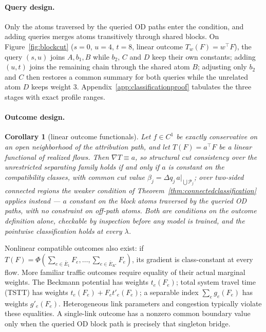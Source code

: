 \documentclass[a4paper,fleqn]{cas-sc}
\newtheorem{corollary}[theorem]{Corollary}
\begin{document}
\paragraph{Query design.}
Only the atoms traversed by the queried OD paths enter the condition, and
adding queries merges atoms transitively through shared blocks. On
Figure~\ref{fig:blockcut} ($s=0$, $u=4$, $t=8$, linear outcome
$T_w(F)=w^\top F$), the query $(s,u)$ joins $A,b_1,B$ while $b_2$, $C$
and $D$ keep their own constants; adding $(u,t)$ joins the remaining
chain through the shared atom $B$; adjusting only $b_2$ and $C$ then
restores a common summary for both queries while the unrelated atom $D$
keeps weight $3$. Appendix~\ref{app:classificationproof} tabulates the
three stages with exact profile ranges.

\paragraph{Outcome design.}
\begin{corollary}[linear outcome functionals]\label{cor:linear}
Let $f\in C^1$ be exactly conservative on an open neighborhood of the
attribution path, and let $T(F)=a^\top F$ be a linear functional of
realized flows. Then $\nabla T\equiv a$, so structural cut consistency
over the unrestricted separating family holds if and only if $a$ is
constant on the compatibility classes, with common cut value
$\beta_j=\Delta q_j\,a|_{\bigcup\mathcal{P}_j}$; over two-sided
connected regions the weaker condition of
Theorem~\ref{thm:connectedclassification} applies instead --- $a$
constant on the block atoms traversed by the queried OD paths, with no
constraint on off-path atoms. Both are conditions on the outcome
definition alone, checkable by inspection before any model is trained,
and the pointwise classification holds at every $\lambda$.
\end{corollary}
Nonlinear compatible outcomes also exist: if
$T(F)=\Phi(\sum_{e\in\bar E_1}F_e,\ldots,\sum_{e\in\bar E_{K'}}F_e)$,
its gradient is class-constant at every flow. More familiar traffic outcomes
require equality of their actual marginal weights. The Beckmann potential
has weights $t_e(F_e)$; total system travel time (TSTT) has weights
$t_e(F_e)+F_et'_e(F_e)$; a separable index $\sum_e g_e(F_e)$ has
weights $g'_e(F_e)$. Heterogeneous link parameters and congestion typically
violate these equalities. A single-link outcome has a nonzero common boundary value
only when the queried OD block path is precisely that singleton bridge.
\end{document}
